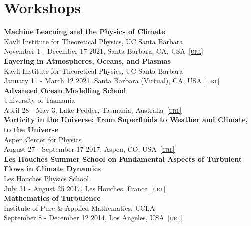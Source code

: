 \documentclass[10pt, letter]{article}
\newcommand{\html}[1]{\href{#1}{\scriptsize\textsc{[url]}}}
\newcommand{\years}[1]{\marginnote{\scriptsize #1}}
\begin{document}

\vspace{-2em}\section*{\bf Workshops}

\noindent\years{2021}\textbf{Machine Learning and the Physics of Climate}\\
Kavli Institute for Theoretical Physics, UC Santa Barbara\\
November 1 - December 17 2021, Santa Barbara, CA, USA~\html{https://www.kitp.ucsb.edu/activities/climate21/}\\[.2cm]
\noindent\years{2021}\textbf{Layering in Atmospheres, Oceans, and Plasmas}\\
Kavli Institute for Theoretical Physics, UC Santa Barbara\\
January 11 - March 12 2021, Santa Barbara (Virtual), CA, USA~\html{https://www.kitp.ucsb.edu/activities/staircase21/}\\[.2cm]
\noindent\years{2019}\textbf{Advanced Ocean Modelling School}\\
University of Tasmania\\
April 28 - May 3, Lake Pedder, Tasmania, Australia~\html{https://climateextremes.org.au/advanced-ocean-modelling-summer-school/}\\[.2cm]
\noindent\years{2017}\textbf{Vorticity in the Universe: From Superfluids to Weather and Climate, to the Universe}\\Aspen Center for Physics\\August 27 - September 17 2017, Aspen, CO, USA~\html{http://www.aspenphys.org/}\\[.2cm]
\noindent\years{2017}\textbf{Les Houches Summer School on Fundamental Aspects of Turbulent Flows in Climate Dynamics}\\Les Houches Physics School\\July 31 - August 25 2017, Les Houches, France~\html{https://climate-houches.sciencesconf.org/}\\[.2cm]
\noindent\years{2014}\textbf{Mathematics of Turbulence}\\Institute of Pure \& Applied Mathematics, UCLA\\September 8 - December 12 2014, Los Angeles, USA~\html{https://www.ipam.ucla.edu/programs/long-programs/mathematics-of-turbulence/}\\[.2cm]
\end{document}
